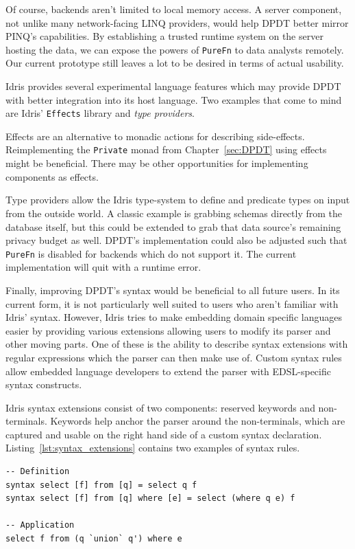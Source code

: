 \documentclass[12pt]{report}
\begin{document}
Of course, backends aren't limited to local memory access.
A server component, not unlike many network-facing LINQ providers, would help DPDT better mirror PINQ's capabilities.
By establishing a trusted runtime system on the server hosting the data, we can expose the powers of \texttt{PureFn} to data analysts remotely.
Our current prototype still leaves a lot to be desired in terms of actual usability.


Idris provides several experimental language features which may provide DPDT with better integration into its host language.
Two examples that come to mind are Idris' \texttt{Effects} library and \textit{type providers}.

Effects are an alternative to monadic actions for describing side-effects.
Reimplementing the \texttt{Private} monad from Chapter~\ref{sec:DPDT} using effects might be beneficial.
There may be other opportunities for implementing components as effects.

Type providers allow the Idris type-system to define and predicate types on input from the outside world.
A classic example is grabbing schemas directly from the database itself, but this could be extended to grab that data source's remaining privacy budget as well.
DPDT's implementation could also be adjusted such that \texttt{PureFn} is disabled for backends which do not support it.
The current implementation will quit with a runtime error.


Finally, improving DPDT's syntax would be beneficial to all future users.
In its current form, it is not particularly well suited to users who aren't familiar with Idris' syntax.
However, Idris tries to make embedding domain specific languages easier by providing various extensions allowing users to modify its parser and other moving parts.
One of these is the ability to describe syntax extensions with regular expressions which the parser can then make use of.
Custom syntax rules allow embedded language developers to extend the parser with EDSL-specific syntax constructs.

Idris syntax extensions consist of two components: reserved keywords and non-terminals.
Keywords help anchor the parser around the non-terminals, which are captured and usable on the right hand side of a custom syntax declaration.
Listing~\ref{lst:syntax_extensions} contains two examples of syntax rules.

\begin{lstlisting}[float,caption={Extending Idris' syntax},label={lst:syntax_extensions}]
-- Definition
syntax select [f] from [q] = select q f
syntax select [f] from [q] where [e] = select (where q e) f

-- Application
select f from (q `union` q') where e
\end{lstlisting}
\end{document}
